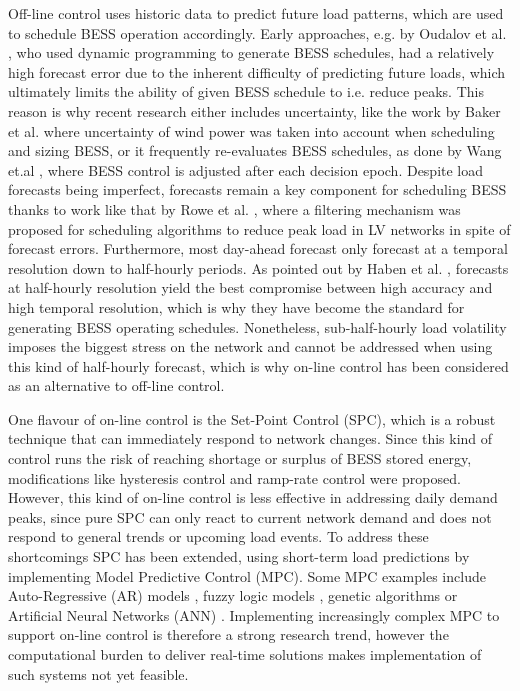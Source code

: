 Off-line control uses historic data to predict future load patterns, which are used to schedule BESS operation accordingly.
Early approaches, e.g. by Oudalov et al. \cite{Oudalov2007}, who used dynamic programming to generate BESS schedules, had a relatively high forecast error due to the inherent difficulty of predicting future loads, which ultimately limits the ability of given BESS schedule to i.e. reduce peaks.
This reason is why recent research either includes uncertainty, like the work by Baker et al. \cite{Baker2017} where uncertainty of wind power was taken into account when scheduling and sizing BESS, or it frequently re-evaluates BESS schedules, as done by Wang et.al \cite{Wang2014a}, where BESS control is adjusted after each decision epoch.
Despite load forecasts being imperfect, forecasts remain a key component for scheduling BESS thanks to work like that by Rowe et al. \cite{Rowe2014a}, where a filtering mechanism was proposed for scheduling algorithms to reduce peak load in LV networks in spite of forecast errors.
Furthermore, most day-ahead forecast only forecast at a temporal resolution down to half-hourly periods.
As pointed out by Haben et al. \cite{Poghosyan2014, Haben2014}, forecasts at half-hourly resolution yield the best compromise between high accuracy and high temporal resolution, which is why they have become the standard for generating BESS operating schedules.
Nonetheless, sub-half-hourly load volatility imposes the biggest stress on the network and cannot be addressed when using this kind of half-hourly forecast, which is why on-line control has been considered as an alternative to off-line control.

One flavour of on-line control is the Set-Point Control (SPC), which is a robust technique that can immediately respond to network changes.
Since this kind of control runs the risk of reaching shortage or surplus of BESS stored energy, modifications like hysteresis control \cite{Gybel2012} and ramp-rate control \cite{Such2012} were proposed.
However, this kind of on-line control is less effective in addressing daily demand peaks, since pure SPC can only react to current network demand and does not respond to general trends or upcoming load events.
To address these shortcomings SPC has been extended, using short-term load predictions by implementing Model Predictive Control (MPC).
Some MPC examples include Auto-Regressive (AR) models \cite{Li2009, Nie2011}, fuzzy logic models \cite{Sannomiya2001, Chen2013a}, genetic algorithms \cite{Xia2015a, Liu2015} or Artificial Neural Networks (ANN) \cite{Kalogirou2014, Quan2014, Lee2014, Pezeshki2014, Vaz2016, Reihani2016, Xiao2017}.
Implementing increasingly complex MPC to support on-line control is therefore a strong research trend, however the computational burden to deliver real-time solutions makes implementation of such systems not yet feasible.